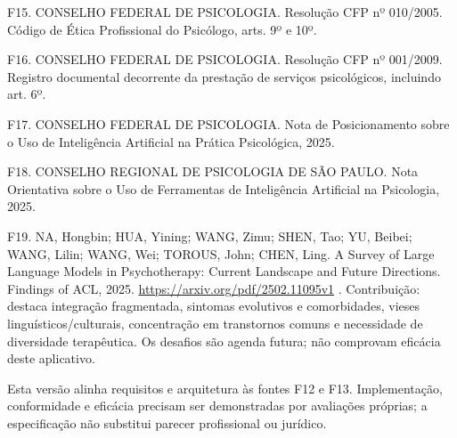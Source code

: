 \documentclass[11pt,a4paper]{article}
\begin{document}
F15. CONSELHO FEDERAL DE PSICOLOGIA. Resolução CFP nº 010/2005. Código de Ética Profissional do Psicólogo, arts. 9º e 10º.

F16. CONSELHO FEDERAL DE PSICOLOGIA. Resolução CFP nº 001/2009. Registro documental decorrente da prestação de serviços psicológicos, incluindo art. 6º.

F17. CONSELHO FEDERAL DE PSICOLOGIA. Nota de Posicionamento sobre o Uso de Inteligência Artificial na Prática Psicológica, 2025.

F18. CONSELHO REGIONAL DE PSICOLOGIA DE SÃO PAULO. Nota Orientativa sobre o Uso de Ferramentas de Inteligência Artificial na Psicologia, 2025.

F19. NA, Hongbin; HUA, Yining; WANG, Zimu; SHEN, Tao; YU, Beibei; WANG, Lilin; WANG, Wei; TOROUS, John; CHEN, Ling. A Survey of Large Language Models in Psychotherapy: Current Landscape and Future Directions. Findings of ACL, 2025. \url{https://arxiv.org/pdf/2502.11095v1} . Contribuição: destaca integração fragmentada, sintomas evolutivos e comorbidades, vieses linguísticos/culturais, concentração em transtornos comuns e necessidade de diversidade terapêutica. Os desafios são agenda futura; não comprovam eficácia deste aplicativo.

Esta versão alinha requisitos e arquitetura às fontes F12 e F13. Implementação, conformidade e eficácia precisam ser demonstradas por avaliações próprias; a especificação não substitui parecer profissional ou jurídico.
\end{document}
